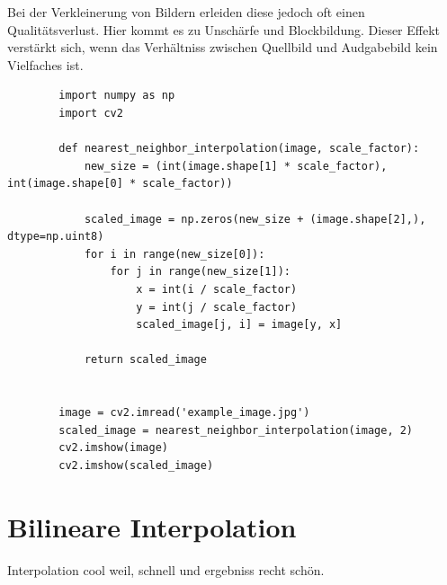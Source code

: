         
        Bei der Verkleinerung von Bildern erleiden diese jedoch oft einen Qualitätsverlust.
        Hier kommt es zu Unschärfe und Blockbildung. 
        Dieser Effekt verstärkt sich, wenn das Verhältniss zwischen Quellbild und Audgabebild kein Vielfaches ist.
        \begin{acronym}
        \end{acronym}
        \begin{lstlisting}
        import numpy as np
        import cv2
        
        def nearest_neighbor_interpolation(image, scale_factor):
            new_size = (int(image.shape[1] * scale_factor), int(image.shape[0] * scale_factor))
            
            scaled_image = np.zeros(new_size + (image.shape[2],), dtype=np.uint8)
            for i in range(new_size[0]):
                for j in range(new_size[1]):
                    x = int(i / scale_factor)
                    y = int(j / scale_factor)
                    scaled_image[j, i] = image[y, x]
            
            return scaled_image
        
        
        image = cv2.imread('example_image.jpg')
        scaled_image = nearest_neighbor_interpolation(image, 2)
        cv2.imshow(image)
        cv2.imshow(scaled_image)
        \end{lstlisting}
    \section{Bilineare Interpolation}
    
        Interpolation cool weil, schnell und ergebniss recht schön.

    

